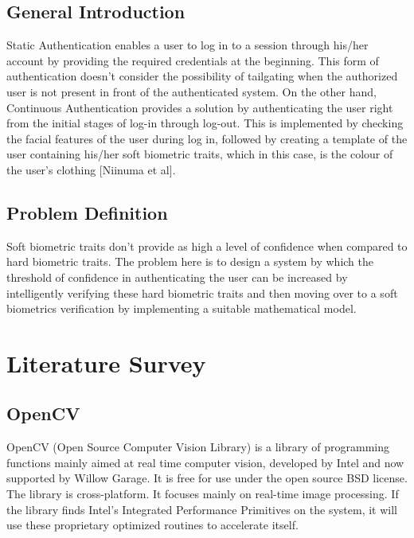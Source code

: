\documentclass[12pt]{article}			%
\begin{document}

\subsection{ General Introduction }
Static Authentication enables a user to log in to a session through his/her account by providing the required credentials at the beginning. This form of authentication doesn’t consider the possibility of tailgating when the authorized user is not present in front of the authenticated system. On the other hand, Continuous Authentication provides a solution by authenticating the user right from the initial stages of log-in through log-out. This is implemented by checking the facial features of the user during log in, followed by creating a template of the user containing his/her soft biometric traits, which in this case, is the colour of the user’s clothing [Niinuma et al]. 

\subsection{ Problem Definition }
Soft biometric traits don’t provide as high a level of confidence when compared to hard biometric traits. The problem here is to design a system by which the threshold of confidence in authenticating the user can be increased by intelligently verifying these hard biometric traits and then moving over to a soft biometrics verification by implementing a suitable mathematical model.


\section{Literature Survey }

\subsection{ OpenCV }
OpenCV (Open Source Computer Vision Library) is a library of programming functions mainly aimed at real time computer vision, developed by Intel and now supported by Willow Garage. It is free for use under the open source BSD license. The library is cross-platform. It focuses mainly on real-time image processing. If the library finds Intel's Integrated Performance Primitives on the system, it will use these proprietary optimized routines to accelerate itself.
\end{document}
